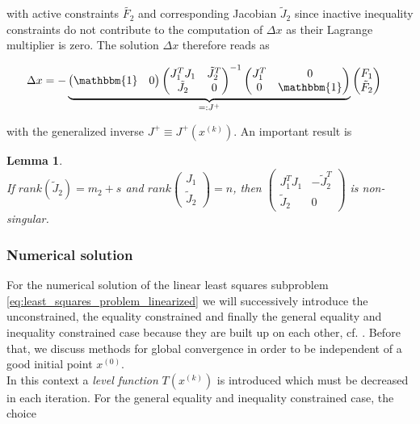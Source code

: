 \documentclass{scrartcl}[12pt, halfparskip]
\numberwithin{equation}{section}
\numberwithin{figure}{section}
\numberwithin{table}{section}
\newtheorem{Lemma}{Lemma}
\begin{document}
with active constraints $\tilde{F_2}$ and corresponding Jacobian $\tilde{J}_2$ since inactive inequality constraints do not contribute to the computation of $\Delta x$ as their Lagrange multiplier is zero. The solution $\Delta x$ therefore reads as

\begin{align}
	\Delta x & =
	- \underbrace{\begin{pmatrix}
		\mathbbm{1} & 0
	\end{pmatrix}
	\begin{pmatrix}
		J_1^T J_1 & \tilde{J}_2^T \\
		\tilde{J}_2 & 0
	\end{pmatrix}^{-1}
	\begin{pmatrix}
		J_1^T & 0 \\
		0 & \mathbbm{1}
	\end{pmatrix}}_{=: J^+}
	\begin{pmatrix}
		F_1 \\
		\tilde{F}_2
	\end{pmatrix}
	\label{eq:GN_solution_formal}
\end{align}

with the generalized inverse $J^+ \equiv J^+(x^{(k)})$. An important result \cite{diss_bock} is

\begin{Lemma} \textcolor{white}{.}\\
	If $rank(\tilde{J}_2) = m_2+s$ and $rank 
	\begin{pmatrix}
	J_1 \\
	\tilde{J}_2
	\end{pmatrix}
	= n$,
	then 	
	$\begin{pmatrix}
		J_1^T J_1 & -\tilde{J}_2^T \\
		\tilde{J}_2 & 0
	\end{pmatrix}$
	is non-singular.
\end{Lemma}

\subsubsection{Numerical solution}
\label{sec:GN_numerical_solution}

For the numerical solution of the linear least squares subproblem \cref{eq:least_squares_problem_linearized} we will successively introduce the unconstrained, the equality constrained and finally the general equality and inequality constrained case because they are built up on each other, cf. \cite{numerical_methods_lsq_Bjorck}. Before that, we discuss methods for global convergence in order to be independent of a good initial point $x^{(0)}$. \\
In this context a \textit{level function} $T(x^{(k)})$ is introduced which must be decreased in each iteration. For the general equality and inequality constrained case, the choice
\end{document}
